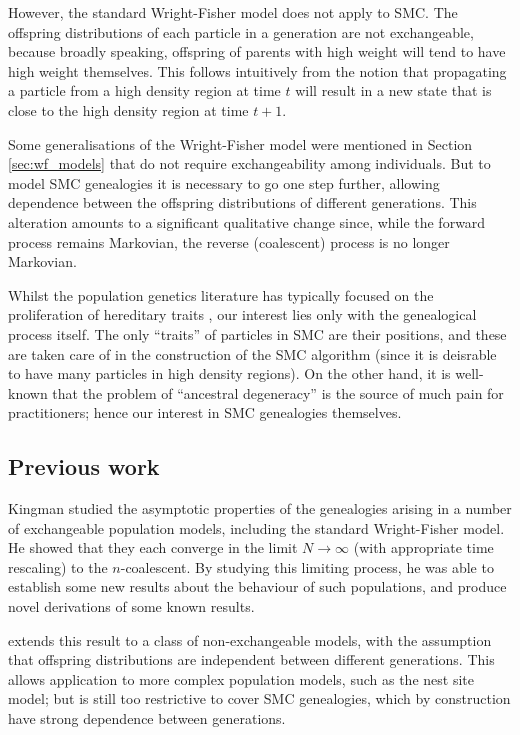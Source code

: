 \documentclass{article}
\begin{document}
However, the standard Wright-Fisher model does not apply to SMC. The offspring distributions of each particle in a generation are not exchangeable, because broadly speaking, offspring of parents with high weight will tend to have high weight themselves. This follows intuitively from the notion that propagating a particle from a high density region at time $t$ will result in a new state that is close to the high density region at time $t+1$.

Some generalisations of the Wright-Fisher model were mentioned in Section \ref{sec:wf_models} that do not require exchangeability among individuals. But to model SMC genealogies it is necessary to go one step further, allowing dependence between the offspring distributions of different generations. This alteration amounts to a significant qualitative change since, while the forward process remains Markovian, the reverse (coalescent) process is no longer Markovian.

Whilst the population genetics literature has typically focused on the proliferation of hereditary traits \citep[Chapter 3]{wakeley2009}, our interest lies only with the genealogical process itself. The only ``traits'' of particles in SMC are their positions, and these are taken care of in the construction of the SMC algorithm (since it is deisrable to have many particles in high density regions). 
On the other hand, it is well-known that the problem of ``ancestral degeneracy'' is the source of much pain for practitioners; hence our interest in SMC genealogies themselves.

\subsection{Previous work}\label{sec:previous}
Kingman \citep{kingman1982gene, kingman1982coal, kingman1982exch} studied the asymptotic properties of the genealogies arising in a number of exchangeable population models, including the standard Wright-Fisher model. He showed that they each converge in the limit $N\to\infty$ (with appropriate time rescaling) to the $n$-coalescent. By studying this limiting process, he was able to establish some new results about the behaviour of such populations, and produce novel derivations of some known results.

\citet{mohle1998} extends this result to a class of non-exchangeable models, with the assumption that offspring distributions are independent between different generations. This allows application to more complex population models, such as the nest site model; but is still too restrictive to cover SMC genealogies, which by construction have strong dependence between generations.
\end{document}
